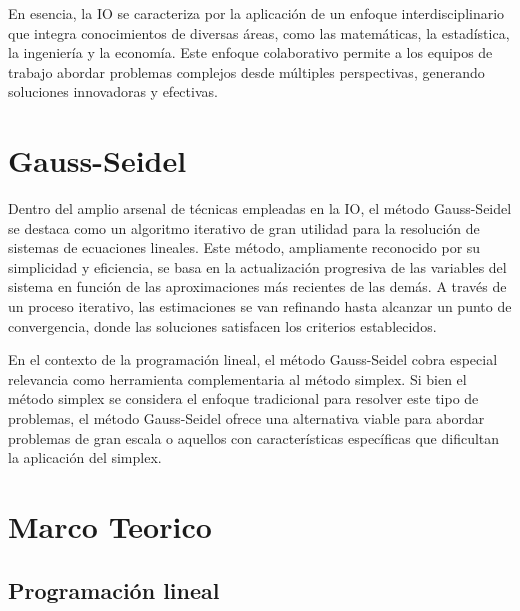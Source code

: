 \documentclass[conference]{IEEEtran}
\begin{document}
En esencia, la IO se caracteriza por la aplicación de un enfoque
interdisciplinario que integra conocimientos de diversas áreas, como
las matemáticas, la estadística, la ingeniería y la economía. Este
enfoque colaborativo permite a los equipos de trabajo abordar problemas
complejos desde múltiples perspectivas, generando soluciones innovadoras
y efectivas.

\section{Gauss-Seidel}

Dentro del amplio arsenal de técnicas empleadas en la IO, el método
Gauss-Seidel se destaca como un algoritmo iterativo de gran utilidad para
la resolución de sistemas de ecuaciones lineales. Este método, ampliamente
reconocido por su simplicidad y eficiencia, se basa en la actualización
progresiva de las variables del sistema en función de las aproximaciones
más recientes de las demás. A través de un proceso iterativo, las
estimaciones se van refinando hasta alcanzar un punto de convergencia, donde
las soluciones satisfacen los criterios establecidos.

En el contexto de la programación lineal, el método Gauss-Seidel cobra
especial relevancia como herramienta complementaria al método simplex. Si
bien el método simplex se considera el enfoque tradicional para resolver
este tipo de problemas, el método Gauss-Seidel ofrece una alternativa viable
para abordar problemas de gran escala o aquellos con características
específicas que dificultan la aplicación del simplex.

\section{Marco Teorico}

\subsection{Programación lineal}




\end{document}
